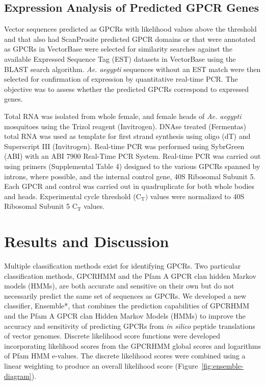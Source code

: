 \subsection{Expression Analysis of Predicted GPCR Genes}
Vector sequences predicted as GPCRs with likelihood values above the threshold and that also had ScanProsite predicted GPCR domains or that were annotated as GPCRs in VectorBase \cite{Lawson2009} were selected for similarity searches against the available Expressed Sequence Tag (EST) datasets in VectorBase using the BLAST search algorithm. \emph{Ae. aegypti} sequences without an EST match were then selected for confirmation of expression by quantitative real-time PCR. The objective was to assess whether the predicted GPCRs correspond to expressed genes.

Total RNA was isolated from whole female, and female heads of \emph{Ae. aegypti} mosquitoes using the Trizol reagent (Invitrogen).  DNAse treated (Fermentas) total RNA was used as template for first strand synthesis using oligo (dT) and Superscript III (Invitrogen).  Real-time PCR was performed using SybrGreen (ABI) with an ABI 7900 Real-Time PCR System.  Real-time PCR was carried out using primers (Supplemental Table 4) designed to the various GPCRs spanned by introns, where possible, and the internal control gene, 40S Ribosomal Subunit 5.  Each GPCR and control was carried out in quadruplicate for both whole bodies and heads.  Experimental cycle threshold ($\text{C}_\text{T})$ values were normalized to 40S Ribosomal Subunit 5 $\text{C}_{\text{T}}$ values.

\section{Results and Discussion}
\label{sec:results}
Multiple classification	methods	exist for identifying GPCRs. Two particular classification methods, GPCRHMM and	the Pfam A GPCR	clan hidden Markov models (HMMs), are both accurate and	sensitive on their own but do not necessarily predict the same set of sequences as GPCRs. We developed a new classifier, Ensemble*, that combines the prediction capabilities of GPCRHMM and the Pfam A GPCR clan Hidden Markov Models (HMMs) to improve the accuracy and sensitivity of predicting GPCRs from \emph{in silico} peptide translations of vector genomes. Discrete likelihood score functions were developed incorporating likelihood scores from the GPCRHMM global scores and logarithms of Pfam HMM e-values. The discrete likelihood scores were combined using a linear weighting to produce an overall likelihood score (Figure~\ref{fig:ensemble-diagram}).

